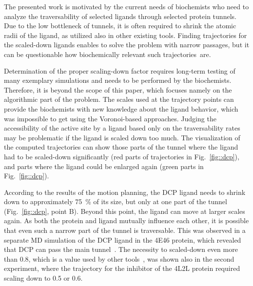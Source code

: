 \documentclass[usletter, 10pt, conference]{ieeeconf} %
\def\smin{s_{min}}
\begin{document}
The presented work is motivated by the current needs of biochemists who need to analyze the traversability of selected ligands through selected protein tunnels.
Due to the low bottleneck of tunnels, it is often required to shrink the atomic radii of the ligand, as utilized also in other existing tools.
Finding trajectories for the scaled-down ligands enables to solve the problem with narrow passages, but it can be questionable how biochemically relevant such trajectories~are.

Determination of the proper scaling-down factor requires long-term testing of many exemplary simulations and needs to be performed by the biochemists. 
Therefore, it is beyond the scope of this paper, which focuses namely on the algorithmic part of the problem.
The scales used at the trajectory points can provide the biochemists with new knowledge about the ligand behavior, which was impossible to get using the Voronoi-based approaches.
Judging the accessibility of the active site by a ligand based only on the traversability rates may be problematic if the ligand is scaled down too much.
The visualization of the computed trajectories can show 
those parts of the tunnel where the ligand had to be scaled-down significantly (red parts of trajectories in Fig.~\ref{fig::dcp}), and parts where the ligand could be enlarged again (green parts in Fig.~\ref{fig::dcp}).

According to the results of the motion planning, the DCP ligand needs to shrink down to approximately 75~\% of its size, but only at one part of the tunnel (Fig.~\ref{fig::dcp}, point B). 
Beyond this point, the ligand can move at larger scales again.
As both the protein and ligand mutually influence each other, it is possible that even such a narrow part of the tunnel is traversable.
This was observed in a separate MD simulation of the DCP ligand in the 4E46 protein, which revealed that DCP can pass the main tunnel~\cite{marques2017catalytic}. 
The necessity to scaled-down even more than 0.8, which is a value used by other tools~\cite{cortes2010simulating}, was
shown also in the second experiment, where the trajectory for the inhibitor of the 4L2L protein required scaling down to 0.5 or 0.6.

\end{document}
